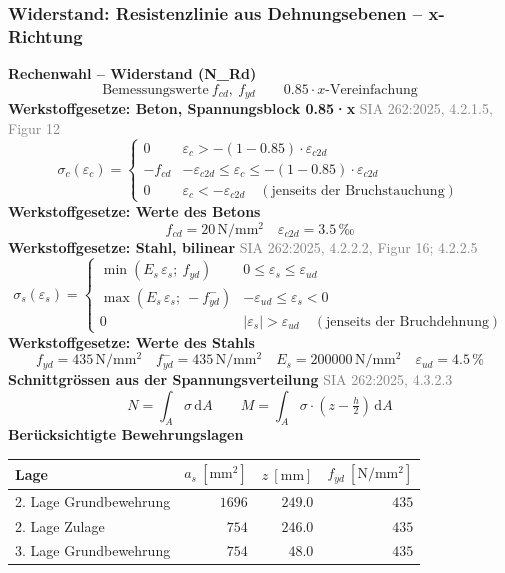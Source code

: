 \documentclass[11pt,a4paper]{article}
\newcommand{\normref}[1]{{\small\textcolor{gray}{#1}}}
\begin{document}
\subsubsection{Widerstand: Resistenzlinie aus Dehnungsebenen – x-Richtung}
\noindent\textbf{Rechenwahl – Widerstand (N\_Rd)}
\begin{equation*}
\text{Bemessungswerte}\ f_{cd},\ f_{yd} \qquad 0.85 \cdot x\text{-Vereinfachung}
\end{equation*}
\noindent\textbf{Werkstoffgesetze: Beton, Spannungsblock 0.85·x} \hfill \normref{SIA 262:2025, 4.2.1.5, Figur 12}
\begin{equation*}
\sigma_c(\varepsilon_c) = \begin{cases} 0 & \varepsilon_c > -(1 - 0.85) \cdot \varepsilon_{c2d} \\[1ex] -f_{cd} & -\varepsilon_{c2d} \le \varepsilon_c \le -(1 - 0.85) \cdot \varepsilon_{c2d} \\[1ex] 0 & \varepsilon_c < -\varepsilon_{c2d} \quad (\text{jenseits der Bruchstauchung}) \end{cases}
\end{equation*}
\noindent\textbf{Werkstoffgesetze: Werte des Betons}
\begin{equation*}
f_{cd} = 20\,\mathrm{N}/\mathrm{mm}^{2} \quad \varepsilon_{c2d} = 3.5\,\text{‰}
\end{equation*}
\noindent\textbf{Werkstoffgesetze: Stahl, bilinear} \hfill \normref{SIA 262:2025, 4.2.2.2, Figur 16; 4.2.2.5}
\begin{equation*}
\sigma_s(\varepsilon_s) = \begin{cases} \min(E_s\,\varepsilon_s;\ f_{yd}) & 0 \le \varepsilon_s \le \varepsilon_{ud} \\[1ex] \max(E_s\,\varepsilon_s;\ -f_{yd}^{-}) & -\varepsilon_{ud} \le \varepsilon_s < 0 \\[1ex] 0 & |\varepsilon_s| > \varepsilon_{ud} \quad (\text{jenseits der Bruchdehnung}) \end{cases}
\end{equation*}
\noindent\textbf{Werkstoffgesetze: Werte des Stahls}
\begin{equation*}
f_{yd} = 435\,\mathrm{N}/\mathrm{mm}^{2} \quad f_{yd}^{-} = 435\,\mathrm{N}/\mathrm{mm}^{2} \quad E_s = 200000\,\mathrm{N}/\mathrm{mm}^{2} \quad \varepsilon_{ud} = 4.5\,\%
\end{equation*}
\noindent\textbf{Schnittgrössen aus der Spannungsverteilung} \hfill \normref{SIA 262:2025, 4.3.2.3}
\begin{equation*}
N = \int_A \sigma\,\mathrm{d}A \qquad M = \int_A \sigma \cdot \left(z - \tfrac{h}{2}\right)\,\mathrm{d}A
\end{equation*}
\noindent\textbf{Berücksichtigte Bewehrungslagen}
\begin{longtable}{lrrr}
\hline
Lage & $a_s\ [\mathrm{mm}^2]$ & $z\ [\mathrm{mm}]$ & $f_{yd}\ [\mathrm{N/mm^2}]$ \\
\hline
\endhead
2. Lage Grundbewehrung & $1696$ & $249.0$ & $435$ \\
2. Lage Zulage & $754$ & $246.0$ & $435$ \\
3. Lage Grundbewehrung & $754$ & $48.0$ & $435$ \\
\hline
\end{longtable}
\end{document}

